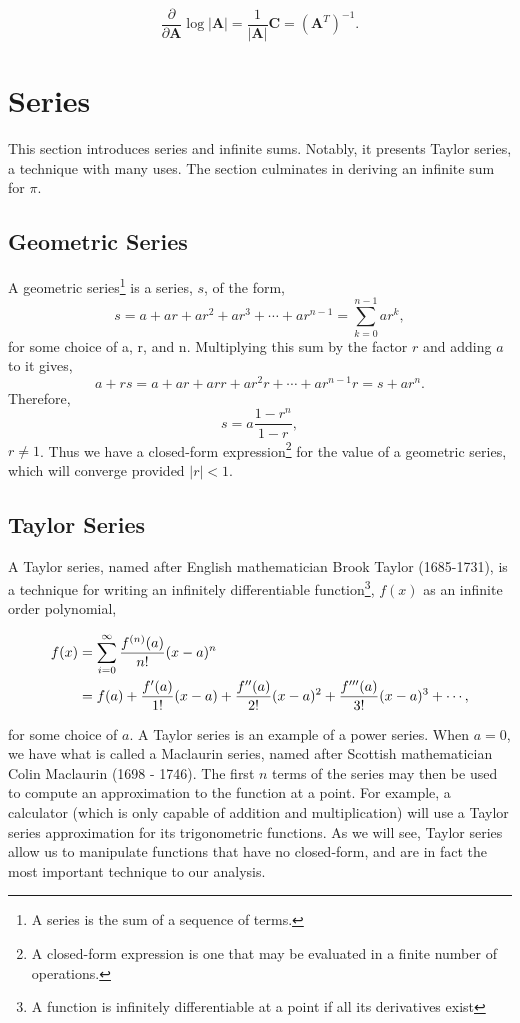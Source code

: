 \documentclass[11pt]{amsart}
\begin{document}
$$\frac{\partial}{\partial \mathbf{A}}\log|\mathbf{A}| = \frac{1}{|\mathbf{A}|}\mathbf{C} = (\mathbf{A}^T)^{-1}.$$

\section{Series}

This section introduces series and infinite sums. Notably, it presents Taylor series, a technique with many uses. The section culminates in deriving an infinite sum for $\pi$.

\subsection{Geometric Series}

A geometric series\footnote{A series is the sum of a sequence of terms.} is a series, $s$, of the form, $$s = a + ar + ar^2 + ar^3 + \cdots + ar^{n-1} = \sum_{k=0}^{n-1}ar^k,$$ for some choice of a, r, and n. Multiplying this sum by the factor $r$ and adding $a$ to it gives, $$a + rs = a + ar + arr + ar^2r + \cdots + ar^{n-1}r = s + ar^n.$$ Therefore, $$s = a\frac{1 - r^n}{1 - r},$$ $r \neq 1$. Thus we have a closed-form expression\footnote{A closed-form expression is one that may be evaluated in a finite number of operations.} for the value of a geometric series, which will converge provided $|r| < 1$.

\subsection{Taylor Series}

A Taylor series, named after English mathematician Brook Taylor (1685-1731), is a technique for writing an infinitely differentiable function\footnote{A function is infinitely differentiable at a point if all its derivatives exist}, $f(x)$ as an infinite order polynomial,

\begin{align}
f(x) &= \sum_{i = 0}^{\infty} \frac{f^{(n)}(a)}{n!}(x - a)^n \notag \\
&= f(a) + \frac{f'(a)}{1!}(x - a) + \frac{f''(a)}{2!}(x - a)^2 + \frac{f'''(a)}{3!}(x - a)^3 + \cdots \notag,
\end{align}

for some choice of $a$. A Taylor series is an example of a power series. When $a = 0$, we have what is called a Maclaurin series, named after Scottish mathematician Colin Maclaurin (1698 - 1746). The first $n$ terms of the series may then be used to compute an approximation to the function at a point. For example, a calculator (which is only capable of addition and multiplication) will use a Taylor series approximation for its trigonometric functions. As we will see, Taylor series allow us to manipulate functions that have no closed-form, and are in fact the most important technique to our analysis.
\end{document}

